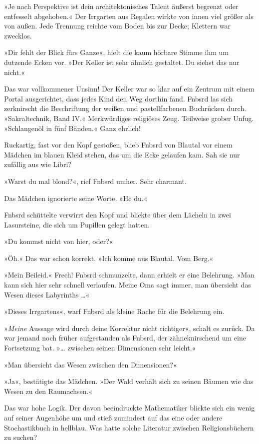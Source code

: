 »Je nach Perspektive ist dein architektonisches Talent äußerst begrenzt oder entfesselt abgehoben.« Der Irrgarten aus Regalen wirkte von innen viel größer als von außen. Jede Trennung reichte vom Boden bis zur Decke; Klettern war zwecklos.

»Dir fehlt der Blick fürs Ganze«, hielt die kaum hörbare Stimme ihm um dutzende Ecken vor. »Der Keller ist sehr ähnlich gestaltet. Du siehst das nur nicht.«

Das war vollkommener Unsinn! Der Keller war so klar auf ein Zentrum mit einem Portal ausgerichtet, dass jedes Kind den Weg dorthin fand. Fnbsrd las sich zerknirscht die Beschriftung der weißen und pastellfarbenen Buchrücken durch. »Sakraltechnik, Band IV.« Merkwürdiges religiöses Zeug. Teilweise grober Unfug. »Schlangenöl in fünf Bänden.« Ganz ehrlich!

Ruckartig, fast vor den Kopf gestoßen, blieb Fnbsrd von Blautal vor einem Mädchen im blauen Kleid stehen, das um die Ecke gelaufen kam. Sah sie nur zufällig aus wie Libri?

»Warst du mal blond?«, rief Fnbsrd umher. Sehr charmant.

Das Mädchen ignorierte seine Worte. »He du.«

Fnbsrd schüttelte verwirrt den Kopf und blickte über dem Lächeln in zwei Lasursteine, die sich um Pupillen gelegt hatten.

»Du kommst nicht von hier, oder?«

»Öh.« Das war schon korrekt. »Ich komme aus Blautal. Vom Berg.«

»Mein Beileid.« Frech! Fnbsrd schmunzelte, dann erhielt er eine Belehrung. »Man kann sich hier sehr schnell verlaufen. Meine Oma sagt immer, man übersieht das Wesen dieses Labyrinths …«

»Dieses Irrgartens«, warf Fnbsrd als kleine Rache für die Belehrung ein.

»\emph{Meine} Aussage wird durch deine Korrektur nicht richtiger«, schalt es zurück. Da war jemand noch früher aufgestanden als Fnbsrd, der zähneknirschend um eine Fortsetzung bat. »… zwischen seinen Dimensionen sehr leicht.«

»Man übersieht das Wesen zwischen den Dimensionen?«

»Ja«, bestätigte das Mädchen. »Der Wald verhält sich zu seinen Bäumen wie das Wesen zu den Raumachsen.«

Das war hohe Logik. Der davon beeindruckte Mathematiker blickte sich ein wenig auf seiner Augenhöhe um und stieß zumindest auf das eine oder andere Stochastikbuch in hellblau. Was hatte solche Literatur zwischen Religionsbüchern zu suchen?

